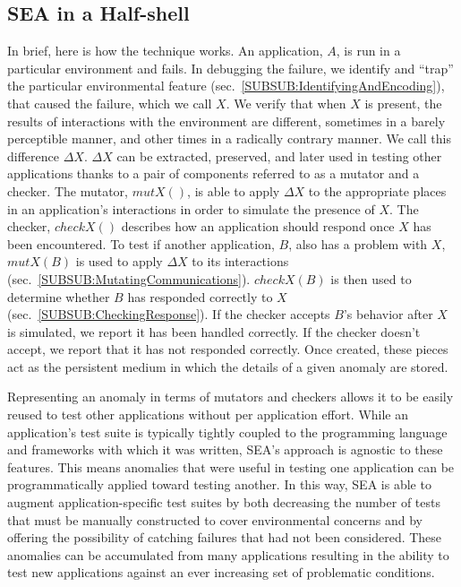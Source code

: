 \subsection{SEA in a Half-shell}
\label{SEC:SEAHalfshell}
In brief,
here is how the technique works.
An application, $A$, is run
in a particular environment and fails.
In debugging the failure,
we identify and ``trap'' the particular environmental feature
(sec.~\ref{SUBSUB:IdentifyingAndEncoding}),
that caused the failure,  which we call $X$.
We verify that when $X$ is present,
the results of interactions with the
environment are different,
sometimes in a barely perceptible manner,
and other times in a radically contrary manner.
We call this difference $\Delta X$.
$\Delta X$ can be extracted, preserved,
and later used in testing other applications
thanks to a pair of components referred to as a mutator and a checker.
The mutator, $mutX()$,
is able to apply $\Delta X$
to the appropriate places in an application's interactions
in order to simulate the presence of $X$.
The checker, $checkX()$ describes how an
application should respond once $X$ has been encountered.
To test if another application, $B$, also has a problem with $X$,
$mutX(B)$ is used to apply $\Delta X$ to its interactions
(sec.~\ref{SUBSUB:MutatingCommunications}).
$checkX(B)$ is then used to determine whether
$B$ has responded correctly to $X$(sec.~\ref{SUBSUB:CheckingResponse}).
If the checker accepts $B$'s behavior
after $X$ is simulated,
we report it has been handled correctly.
If the checker doesn't accept, we report that it has not responded correctly.
Once created,
these pieces act as the persistent medium in which the details of
a given anomaly are stored.

Representing an anomaly in terms of mutators and checkers
allows it to be easily reused to test other applications
without per application effort.
While an application's test suite is typically
tightly coupled to the programming language
and frameworks with which it was written,
SEA's approach is agnostic to these features.
This means anomalies that were useful in testing one application
can be programmatically applied toward testing another.
In this way, SEA is able to augment application-specific test suites
by both decreasing the number of tests
that must be manually constructed
to cover environmental concerns
and by offering the possibility of catching
failures that had not been considered.
These anomalies can be accumulated from many applications
resulting in the ability to test new applications
against an ever increasing
set of problematic conditions.

